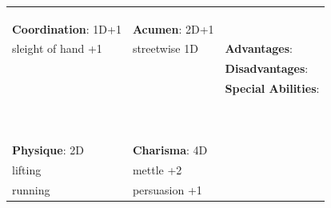 \documentclass[10pt]{article}
\begin{document}
\begin{table}
\begin{tabular}{m{156pt} m{156pt} m{156pt}}
 \hrulefill &  \hrulefill & \\

 \hrulefill &  \hrulefill & \\

 \hrulefill &  \hrulefill & \\


\textbf{Coordination}: 1D+1 \hrulefill & \textbf{Acumen}: 2D+1 \hrulefill     & \hrulefill \\

sleight of hand   +1 \hrulefill & streetwise        1D \hrulefill & \textbf{Advantages}: \hrulefill \\

 \hrulefill &  \hrulefill & \textbf{Disadvantages}: \hrulefill \\

 \hrulefill &  \hrulefill & \textbf{Special Abilities}: \hrulefill \\

 \hrulefill &  \hrulefill &  \hrulefill \\

 \hrulefill &  \hrulefill &  \hrulefill \\

 \hrulefill &  \hrulefill &  \hrulefill \\

 \hrulefill &  \hrulefill &  \hrulefill \\

 \hrulefill &  \hrulefill &  \hrulefill \\

 \hrulefill &  \hrulefill &  \hrulefill \\

 \hrulefill &  \hrulefill &  \hrulefill \\

 \hrulefill &  \hrulefill &  \hrulefill \\

 \hrulefill &  \hrulefill &  \hrulefill \\

 \hrulefill &  \hrulefill &  \hrulefill \\


\textbf{Physique}: 2D \hrulefill & \textbf{Charisma}: 4D \hrulefill     &  \hrulefill \\

lifting              \hrulefill & mettle            +2 \hrulefill &  \hrulefill \\

running              \hrulefill & persuasion        +1 \hrulefill &  \hrulefill \\


\end{tabular}
\end{table}
\end{document}

